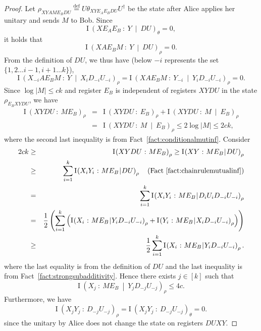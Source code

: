 \documentclass[11pt,a4paper]{article}
\theoremstyle{plain}
\theoremstyle{definition}
\newcommand {\br} [1] {\ensuremath{ \left( #1 \right) }}
\newcommand {\minusspace} {\: \! \!}
\newcommand {\smallspace} {\: \!}
\newcommand {\fn} [2] {\ensuremath{ #1 \minusspace \br{ #2 } }}
\newcommand {\defeq} {\ensuremath{ \stackrel{\mathrm{def}}{=} }}
\newcommand {\mutinf} [2] {\fn{\mathrm{I}}{#1 \smallspace : \smallspace #2}}
\newcommand {\condmutinf} [3] {\mutinf{#1}{#2 \smallspace \middle\vert \smallspace #3}}
\newcommand {\abs} [1] {\ensuremath{ \left| #1 \right| }}
\begin{document}
\begin{proof}
 Let $\rho_{XYAME_BDU}\defeq U\theta_{XYE_AE_BDU} U^{\dagger}$ be the state after Alice applies her unitary and sends $M$ to Bob. Since $$\condmutinf{XE_AE_B}{Y}{DU}_{\theta}=0,$$ it holds that  
\[\condmutinf{XAE_BM}{Y}{DU}_{\rho}=0.\]
From the definition of $DU$, we thus have (below $-i$ represents the set $\{1,2\ldots i-1,i+1\ldots k\}$),
\begin{equation}\label{eqn:dumarkov}
\condmutinf{X_{-i}AE_BM}{Y}{X_iD_{-i}U_{-i}}_{\rho}=\condmutinf{XAE_BM}{Y_{-i}}{Y_iD_{-i}U_{-i}}_{\rho}=0.
\end{equation}
Since $\log\abs{M}\leq ck$ and register $E_B$ is independent of registers $XYDU$ in the state $\rho_{E_BXYDU}$, we have
\begin{eqnarray*}
\mutinf{XYDU}{ME_B}_{\rho}&=&\mutinf{XYDU}{E_B}_{\rho}+\condmutinf{XYDU}{M}{E_B}_{\rho}\\ &=& \condmutinf{XYDU}{M}{E_B}_{\rho} \leq 2 \log\abs{M} \leq 2ck,
\end{eqnarray*}
where the second last inequality is from Fact~\ref{fact:conditionalmutinf}.
Consider
\begin{eqnarray*}
2ck&\geq& \mutinf{XYDU}{ME_B}_{\rho}\geq \condmutinf{XY}{ME_B}{DU}_{\rho}\\ &\geq&\sum_{i=1}^k\condmutinf{X_iY_i}{ME_B}{DU}_{\rho} \quad (\text{Fact} ~\ref{fact:chainrulemutualinf})\\
&=& \sum_{i=1}^k \condmutinf{X_iY_i}{ME_B}{D_iU_iD_{-i}U_{-i}}_{\rho} 	\\ &=&\frac{1}{2}\br{\sum_{i=1}^k\br{\condmutinf{X_i}{ME_B}{Y_iD_{-i}U_{-i}}_{\rho}+\condmutinf{Y_i}{ME_B}{X_iD_{-i}U_{-i}}_{\rho}}}\\
&\geq&\frac{1}{2}\sum_{i=1}^k\condmutinf{X_i}{ME_B}{Y_iD_{-i}U_{-i}}_{\rho}.
\end{eqnarray*}
where the last equality is from the definition of $DU$ and the last inequality is from Fact~\ref{fact:strongsubadditivity}.
Hence there exists $j\in[k]$ such that
\begin{equation}\label{eqn:directsummessagelength}
\condmutinf{X_j}{ME_B}{Y_jD_{-j}U_{-j}}_{\rho}\leq 4c.
\end{equation}
Furthermore, we have 
\begin{equation}\label{eqn:directsumpubliccoins}
\mutinf{X_jY_j}{D_{-j}U_{-j}}_{\rho}= \mutinf{X_jY_j}{D_{-j}U_{-j}}_{\theta} = 0.
\end{equation}
since the unitary by Alice does not change the state on registers $DUXY$.


\end{proof}
\end{document}
